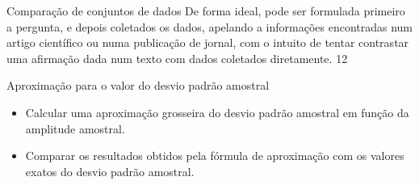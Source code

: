 {{{\begin{sugestions}{Comparação de conjuntos de dados}
{De forma ideal, pode ser formulada primeiro a pergunta, e depois coletados os dados, apelando a informações encontradas num artigo científico ou numa publicação de jornal, com o intuito de tentar contrastar uma afirmação dada num texto com dados coletados diretamente.
}{1}{2}
\end{sugestions}
\begin{objectives}{Aproximação para o valor do desvio padrão amostral}
{
\begin{itemize}
\item Calcular uma aproximação grosseira do desvio padrão amostral em função da amplitude amostral.

\item Comparar os resultados obtidos pela fórmula de aproximação com os valores exatos do desvio padrão amostral.


\end{itemize}}
\end{objectives}}}}

